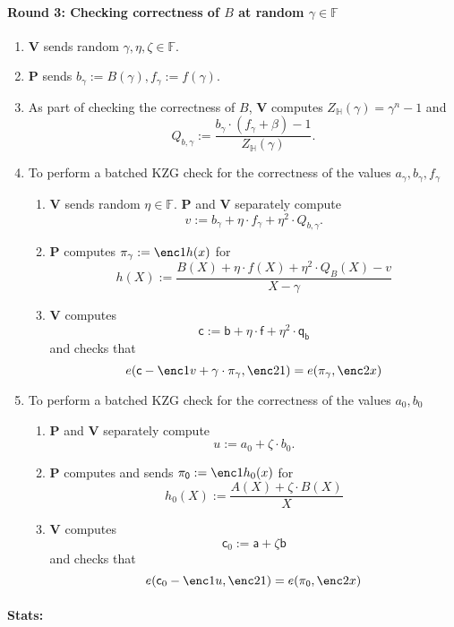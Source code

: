 \documentclass[11pt]{article} %
\newcommand{\F}{\ensuremath{\mathbb F}\xspace}
\newcommand{\defeq}{:=}
\newcommand{\prv}{\ensuremath{\mathsf{\mathbf{P}}}\xspace}
\newcommand{\ver}{\ensuremath{\mathsf{\mathbf{V}}}\xspace}
\newcommand{\subspace}{\ensuremath{\mathbb{H}}\xspace}
\newcommand{\witsize}{\ensuremath{n}\xspace}
\renewcommand{\a}{\ensuremath{\mathsf{a}}\xspace}
\renewcommand{\b}{\ensuremath{\mathsf{b}}\xspace}
\renewcommand{\c}{\ensuremath{\mathsf{c}}\xspace}
\newcommand{\f}{\ensuremath{\mathsf{f}}\xspace}
\newcommand{\qb}{\ensuremath{\mathsf{q_b}}\xspace}
\newcommand{\agam}{\ensuremath{a_\gamma}\xspace}
\newcommand{\gamproof}{\ensuremath{\mathsf{\pi_\gamma}}\xspace}
\newcommand{\zerproof}{\ensuremath{\mathsf{\pi_0}}\xspace}
\newcommand{\bgam}{\ensuremath{b_\gamma}\xspace}
\newcommand{\qbgam}{\ensuremath{Q_{b,\gamma}}\xspace}
\newcommand{\fgam}{\ensuremath{f_{\gamma}}\xspace}
\begin{document}
	\paragraph{\textbf{Round 3:} Checking correctness of  $B$ at random $\gamma \in \F$}
 \begin{enumerate}
\item \ver sends random $\gamma,\eta,\zeta \in \F$.
\item \prv sends $\bgam \defeq B(\gamma),\fgam \defeq f(\gamma)$.
\item\label{step:setQB} As part of checking the correctness of $B$, \ver computes $ Z_\subspace(\gamma) = \gamma^\witsize -1$ and
\[\qbgam\defeq \frac{\bgam\cdot (\fgam + \beta)-1}{Z_\subspace(\gamma)}.\]
\item To perform a batched KZG check for the correctness of the values  $\agam,\bgam,\fgam$
  \begin{enumerate}
   \item \ver sends random $\eta\in \F$. \prv and \ver separately compute
   \[v\defeq \bgam +\eta\cdot\fgam + \eta^2\cdot \qbgam.\]
   \item \prv computes $\gamproof\defeq \enc1{h(x)}$ for 
   \[h(X)\defeq \frac{ B(X)+ \eta\cdot f(X) + \eta^2\cdot Q_B(X) -v}{X-\gamma}\]
   \item\label{step:checkKZG1} \ver computes 
   \[\c\defeq \b+\eta\cdot \f +\eta^2\cdot \qb\]
   and  checks that 
   \[e(\c-\enc1{v}+\gamma\cdot \gamproof,\enc2{1})=e(\gamproof,\enc2{x})\]
  \end{enumerate}
\item To perform a batched KZG check for the correctness of the values  $a_0,b_0$
  \begin{enumerate}
   \item  \prv and \ver separately compute
   \[u\defeq a_0+\zeta \cdot b_0.\] 
   \item \prv computes and sends $\zerproof\defeq \enc1{h_0(x)}$ for 
   \[h_0(X)\defeq \frac{A(X)+\zeta\cdot B(X)}{X}\]
   \item\label{step:checkKZG2} \ver computes 
   \[\c_0 \defeq \a +\zeta \b\]
   and  checks that 
   \[e(\c_0-\enc1{u},\enc2{1})=e(\zerproof,\enc2{x})\]
  \end{enumerate}

\end{enumerate}

\paragraph{Stats:}
\end{document}

